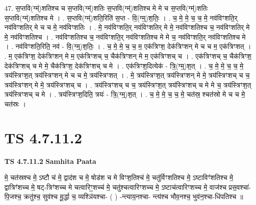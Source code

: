 \documentclass[17pt]{extarticle}
\begin{document}
47. स॒प्तवि(ग्म्॑)शतिश्च च स॒प्तवि(ग्म्॑)शतिः स॒प्तवि(ग्म्॑)शतिश्च मे मे च स॒प्तवि(ग्म्॑)शतिः स॒प्तवि(ग्म्॑)शतिश्च मे । . स॒प्तवि(ग्म्॑)शति॒रिति॑ स॒प्त - वि॒(ग्म्॒)श॒तिः॒ । . च॒ मे॒ मे॒ च॒ च॒ मे॒ नव॑विꣳशति॒र् नव॑विꣳशतिर् मे च च मे॒ नव॑विꣳशतिः । . मे॒ नव॑विꣳशति॒र् नव॑विꣳशतिर् मे मे॒ नव॑विꣳशतिश्च च॒ नव॑विꣳशतिर् मे मे॒ नव॑विꣳशतिश्च । . नव॑विꣳशतिश्च च॒ नव॑विꣳशति॒र् नव॑विꣳशतिश्च मे मे च॒ नव॑विꣳशति॒र् नव॑विꣳशतिश्च मे । . नव॑विꣳशति॒रिति॒ नव॑ - वि॒(ग्म्॒)श॒तिः॒ । . च॒ मे॒ मे॒ च॒ च॒ म॒ एक॑त्रिꣳश॒ देक॑त्रिꣳशन् मे च च म॒ एक॑त्रिꣳशत् । . म॒ एक॑त्रिꣳश॒ देक॑त्रिꣳशन् मे म॒ एक॑त्रिꣳशच् च॒ चैक॑त्रिꣳशन् मे म॒ एक॑त्रिꣳशच् च । . एक॑त्रिꣳशच् च॒ चैक॑त्रिꣳश॒ देक॑त्रिꣳशच् च मे मे॒ चैक॑त्रिꣳश॒ देक॑त्रिꣳशच् च मे । . एक॑त्रिꣳश॒दित्येक॑ - त्रि॒(ग्म्॒)श॒त् । . च॒ मे॒ मे॒ च॒ च॒ मे॒ त्रय॑स्त्रिꣳश॒त् त्रय॑स्त्रिꣳशन् मे च च मे॒ त्रय॑स्त्रिꣳशत् । . मे॒ त्रय॑स्त्रिꣳश॒त् त्रय॑स्त्रिꣳशन् मे मे॒ त्रय॑स्त्रिꣳशच् च च॒ त्रय॑स्त्रिꣳशन् मे मे॒ त्रय॑स्त्रिꣳशच् च । . त्रय॑स्त्रिꣳशच् च च॒ त्रय॑स्त्रिꣳश॒त् त्रय॑स्त्रिꣳशच् च मे मे च॒ त्रय॑स्त्रिꣳश॒त् त्रय॑स्त्रिꣳशच् च मे । . त्रय॑स्त्रिꣳश॒दिति॒ त्रयः॑ - त्रि॒(ग्म्॒)श॒त् । . च॒ मे॒ मे॒ च॒ च॒ मे॒ चत॑स्र॒ श्चत॑स्रो मे च च मे॒ चत॑स्रः । \newline
\pagebreak
{}

\section{ TS 4.7.11.2 }

\textbf{TS 4.7.11.2 } \newline
\textbf{Samhita Paata} \newline

मे॒ चत॑स्रश्च मे॒ ऽष्टौ च॑ मे॒ द्वाद॑श च मे॒ षोड॑श च मे विꣳश॒तिश्च॑ मे॒ चतु॑र्विꣳशतिश्च मे॒ ऽष्टाविꣳ॑शतिश्च मे॒ द्वात्रिꣳ॑शच्च मे॒ षट्-त्रिꣳ॑शच्च मे चत्वारिꣳ॒॒शच्च॑ मे॒ चतु॑श्चत्वारिꣳशच्च मे॒ ऽष्टाच॑त्वारिꣳशच्च मे॒ वाज॑श्च प्रस॒वश्चा॑-पि॒जश्च॒ क्रतु॑श्च॒ सुव॑श्च मू॒र्द्धा च॒ व्यश्ञि॑यश्चा- ( ) -न्त्याय॒नश्चा- न्त्य॑श्च भौव॒नश्च॒ भुव॑न॒श्चा-धि॑पतिश्च ॥ \newline
\end{document}
